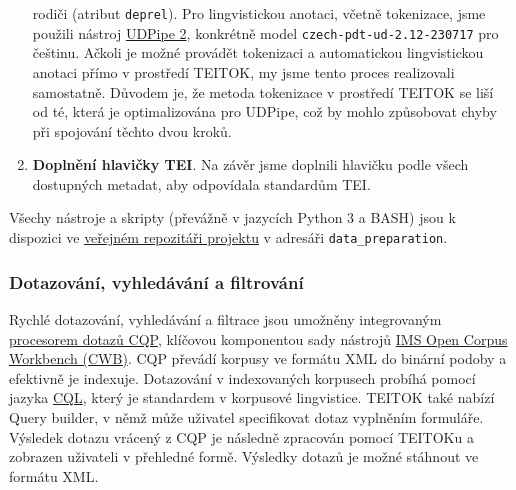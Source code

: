 \documentclass[
]{article}
\begin{document}
\begin{enumerate}
  rodiči (atribut \texttt{deprel}). Pro lingvistickou anotaci, včetně
  tokenizace, jsme použili nástroj
  \href{https://ufal.mff.cuni.cz/udpipe/2}{UDPipe 2}, konkrétně model
  \texttt{czech-pdt-ud-2.12-230717} pro češtinu. Ačkoli je možné
  provádět tokenizaci a automatickou lingvistickou anotaci přímo v
  prostředí TEITOK, my jsme tento proces realizovali samostatně. Důvodem
  je, že metoda tokenizace v prostředí TEITOK se liší od té, která je
  optimalizována pro UDPipe, což by mohlo způsobovat chyby při spojování
  těchto dvou kroků.
\item
  \textbf{Doplnění hlavičky TEI}. Na závěr jsme doplnili hlavičku podle
  všech dostupných metadat, aby odpovídala standardům TEI.
\end{enumerate}

Všechy nástroje a skripty (převážně v jazycích Python 3 a BASH) jsou k
dispozici ve \href{https://github.com/ufal/evaldio}{veřejném repozitáři
projektu} v adresáři \texttt{data\_preparation}.

\hypertarget{dotazovuxe1nuxed-vyhleduxe1vuxe1nuxed-a-filtrovuxe1nuxed}{%
\subsubsection{Dotazování, vyhledávání a
filtrování}\label{dotazovuxe1nuxed-vyhleduxe1vuxe1nuxed-a-filtrovuxe1nuxed}}

Rychlé dotazování, vyhledávání a filtrace jsou umožněny integrovaným
\href{https://cwb.sourceforge.io/files/CQP_Manual.pdf}{procesorem dotazů
CQP}, klíčovou komponentou sady nástrojů
\href{https://cwb.sourceforge.io/}{IMS Open Corpus Workbench (CWB)}. CQP
převádí korpusy ve formátu XML do binární podoby a efektivně je
indexuje. Dotazování v indexovaných korpusech probíhá pomocí jazyka
\href{https://www.cambridge.org/sketch/help/userguides/CQL\%20Help\%201.3.pdf}{CQL},
který je standardem v korpusové lingvistice. TEITOK také nabízí Query
builder, v němž může uživatel specifikovat dotaz vyplněním formuláře.
Výsledek dotazu vrácený z CQP je následně zpracován pomocí TEITOKu a
zobrazen uživateli v přehledné formě. Výsledky dotazů je možné stáhnout
ve formátu XML.
\end{document}
